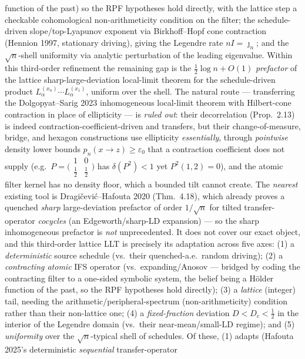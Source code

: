 \documentclass[
]{article}
\begin{document}
function of the past) so the RPF hypotheses hold directly, with the lattice step a checkable
cohomological non-arithmeticity condition on the filter; the schedule-driven slope/top-Lyapunov exponent via Birkhoff--Hopf cone
contraction (Hennion 1997, stationary driving), giving the Legendre rate $nI=\jmath_n$; and the
$\sqrt n$-shell uniformity via analytic perturbation of the leading eigenvalue. Within this
third-order refinement the remaining gap is the $\tfrac12\log n+O(1)$ \emph{prefactor} of the lattice
sharp-large-deviation local-limit theorem for the schedule-driven product
$L_\alpha^{(x_n)}\cdots L_\alpha^{(x_1)}$, uniform over the shell. The natural route --- transferring the Dolgopyat--Sarig 2023 inhomogeneous
local-limit theorem with Hilbert-cone contraction in place of ellipticity --- is \emph{ruled out}:
their decorrelation (Prop.~2.13) is indeed contraction-coefficient-driven and transfers, but their
change-of-measure, bridge, and hexagon constructions use ellipticity \emph{essentially}, through
\emph{pointwise} density lower bounds $p_n(x\to z)\ge\varepsilon_0$ that a contraction coefficient does
not supply (e.g.\ $P=\big(\begin{smallmatrix}1&0\\ \tfrac12&\tfrac12\end{smallmatrix}\big)$ has
$\delta(P^2)<1$ yet $P^2(1,2)=0$), and the atomic filter kernel has no density floor, which a bounded
tilt cannot create. The \emph{nearest} existing tool is Dragi\v cevi\'c--Hafouta 2020 (Thm.~4.18),
which already proves a quenched \emph{sharp} large-deviation prefactor of order $1/\sqrt n$ for tilted
transfer-operator \emph{cocycles} (an Edgeworth/sharp-LD expansion) --- so the sharp inhomogeneous
prefactor is \emph{not} unprecedented. It does not cover our exact object, and this third-order lattice
LLT is precisely its adaptation across five axes: (1) a \emph{deterministic} source schedule (vs.\ their quenched-a.e.\
random driving); (2) a \emph{contracting atomic} IFS operator (vs.\ expanding/Anosov --- bridged by
coding the contracting filter to a one-sided symbolic system, the belief being a H\"older function of
the past, so the RPF hypotheses hold directly); (3) a \emph{lattice} (integer) tail, needing the
arithmetic/peripheral-spectrum (non-arithmeticity) condition rather than their non-lattice one;
(4) a \emph{fixed-fraction} deviation $D<D_c<\tfrac12$ in the interior of the Legendre domain (vs.\
their near-mean/small-LD regime); and (5) \emph{uniformity} over the $\sqrt n$-typical shell of
schedules. Of these, (1) adapts (Hafouta 2025's deterministic \emph{sequential} transfer-operator
\end{document}
